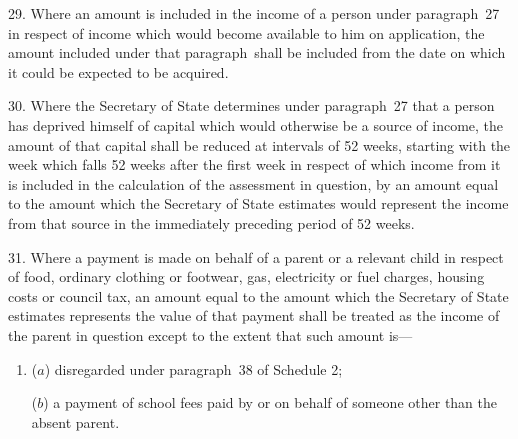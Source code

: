 \documentclass[12pt,a4paper]{article}
\begin{document}

\medskip

29.  Where an amount is included in the income of a person under paragraph~27 in respect of income which would become available to him on application, the amount included under that paragraph~shall be included from the date on which it could be expected to be acquired.

\medskip

30.  Where 
the Secretary of State  %
determines under paragraph~27 that a person has deprived himself of capital which would otherwise be a source of income, the amount of that capital shall be reduced at intervals of 52 weeks, starting with the week which falls 52 weeks after the first week in respect of which income from it is included in the calculation of the assessment in question, by an amount equal to the amount which the 
Secretary of State  %
estimates would represent the income from that source in the immediately preceding period of 52 weeks.


\medskip

31.  Where a payment is made on behalf of a parent or a relevant child in respect of food, ordinary clothing or footwear, gas, electricity or fuel charges, housing costs or council tax, an amount equal to the amount which the 
Secretary of State  %
estimates represents the value of that payment shall be treated as the income of the parent in question except to the extent that such amount is—
\begin{enumerate}\item[]
($a$) disregarded under paragraph~38 of Schedule 2;

($b$) a payment of school fees paid by or on behalf of someone other than the absent parent.
\end{enumerate}
\end{document}
